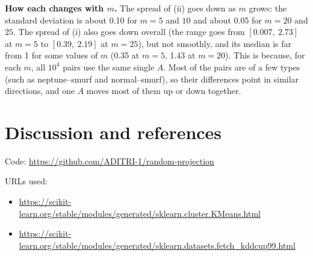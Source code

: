 \documentclass[11pt,a4paper]{article}
\begin{document}
\textbf{How each changes with $m$.} The spread of (ii) goes down as $m$ grows: the standard
deviation is about 0.10 for $m=5$ and $10$ and about 0.05 for $m=20$ and $25$. The spread of (i)
also goes down overall (the range goes from $[0.007,\ 2.73]$ at $m=5$ to $[0.39,\ 2.19]$ at
$m=25$), but not smoothly, and its median is far from 1 for some values of $m$ (0.35 at $m=5$,
1.43 at $m=20$). This is because, for each $m$, all $10^4$ pairs use the same single $A$. Most of
the pairs are of a few types (such as neptune--smurf and normal--smurf), so their differences
point in similar directions, and one $A$ moves most of them up or down together.



\section*{Discussion and references}

Code: \url{https://github.com/ADITRI-1/random-projection}

URLs used:
\begin{itemize}
    \item \url{https://scikit-learn.org/stable/modules/generated/sklearn.cluster.KMeans.html}
    \item \url{https://scikit-learn.org/stable/modules/generated/sklearn.datasets.fetch_kddcup99.html}
\end{itemize}
\end{document}
